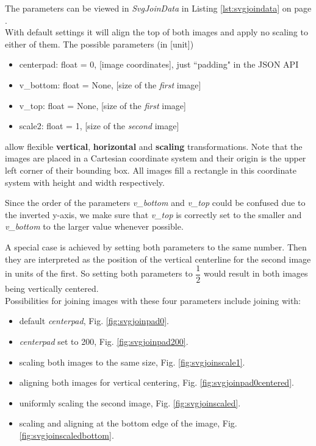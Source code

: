 \documentclass[a4paper, 12pt, bibliography=totoc]{scrartcl}
\begin{document}
The parameters can be viewed in \textit{SvgJoinData} in Listing \ref{lst:svgjoindata} on page \pageref{lst:svgjoindata}.\\

With default settings it will align the top of both images and apply no scaling to either of them.
The possible parameters (in [unit])
\begin{itemize}
	\item centerpad: float = 0, [image coordinates], just ``padding" in the JSON API
	\item v\_bottom: float = None, [size of the \textit{first} image]
	\item v\_top: float = None, [size of the \textit{first} image]
	\item scale2: float = 1, [size of the \textit{second} image]
\end{itemize}
allow flexible \textbf{vertical}, \textbf{horizontal} and \textbf{scaling} transformations.
Note that the images are placed in a Cartesian coordinate system and their origin is the upper left corner of their bounding box. All images fill a rectangle in this coordinate system with height and width respectively.

Since the order of the parameters \textit{v\_bottom} and \textit{v\_top} could be confused due to the inverted y-axis, we make sure that \textit{v\_top} is correctly set to the smaller and \textit{v\_bottom} to the larger value whenever possible.

A special case is achieved by setting both parameters to the same number. Then they are interpreted as the position of the vertical centerline for the second image in units of the first. So setting both parameters to $\dfrac{1}{2}$ would result in both images being vertically centered.\\

Possibilities for joining images with these four parameters include joining with:
\begin{itemize}[label=-, left=40pt]
	\item default \textit{centerpad}, Fig. \ref{fig:svgjoinpad0}.
	\item \textit{centerpad} set to 200, Fig. \ref{fig:svgjoinpad200}.
	\item scaling both images to the same size, Fig. \ref{fig:svgjoinscale1}.
	\item aligning both images for vertical centering, Fig. \ref{fig:svgjoinpad0centered}.
	\item uniformly scaling the second image, Fig. \ref{fig:svgjoinscaled}.
	\item scaling and aligning at the bottom edge of the image, Fig. \ref{fig:svgjoinscaledbottom}.
\end{itemize}
\end{document}
